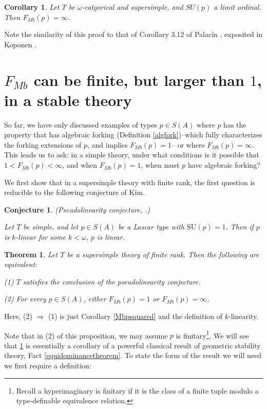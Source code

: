\documentclass[11pt]{amsart}
\newtheorem{thm}[theorem]{Theorem}
\newtheorem{cor}[theorem]{Corollary}
\newtheorem{conj}[theorem]{Conjecture}
\theoremstyle{definition}
\theoremstyle{remark}
\numberwithin{equation}{section}
\begin{document}
\begin{cor}
\label{omegacategoricalsupersimple}
    Let $T$ be $\omega$-catgorical and supersimple, and $SU(p)$ a limit ordinal. Then $F_{Mb}(p) = \infty$.
\end{cor}
Note the similarity of this proof to that of Corollary 3.12 of Palacín \cite{Pal17}, exposited in Koponen \cite{Kop19}. 


\section{$F_{Mb}$ can be finite, but larger than $1$, in a stable theory}\label{Mbfinitestable}
 \setcounter{theorem}{0}
So far, we have only discussed examples of types $p \in S(A)$ where $p$ has the property that has algebraic forking (Definition \ref{algfork})--which fully characterizes the forking extensions of $p$, and implies $F_{Mb}(p) =1 $-- or 
 where $F_{Mb}(p) = \infty $. This leads us to ask: in a simple theory, under what conditions is it possible that $1 < F_{Mb}(p) < \infty$, and when $F_{Mb}(p)= 1$, when must $p$ have algebraic forking? 

 We first show that in a supersimple theory with finite rank, the first question is reducible to the following conjecture of Kim.

 \begin{conj}
    (Pseudolinearity conjecture, \cite{Kim10}.)
     
     
     Let $T$ be simple, and let $p \in S(A)$ be a Lascar type with $\mathrm{SU}(p) =1$. Then if $p$ is $k$-linear for some $k < \omega$, $p$ is linear.
 \end{conj}

 \begin{thm}
      \label{Mboneinfinity}
 Let $T$ be a supersimple theory of finite rank. Then the following are equivalent:

 (1) $T$ satisfies the conclusion of the pseudolinearity conjecture.

 (2) For every $p \in S(A)$, either $F_{Mb}(p) =1$ or $F_{Mb}(p) = \infty$.
  \end{thm}

Here, (2) $\Rightarrow$ (1) is just Corollary \ref{Mbpsquared} and the definition of $k$-linearity.


Note that in (2) of this proposition, we may assume $p$ is finitary\footnote{Recall a hyperimaginary is finitary if it is the class of a finite tuple modulo
a type-definable equivalence relation.}. We will see that \ref{Mboneinfinity} is essentially a corollary of a powerful classical result of geometric stability theory, Fact \ref{equidominancetheorem}. To state the form of the result we will need we first require a definition: 
\end{document}
